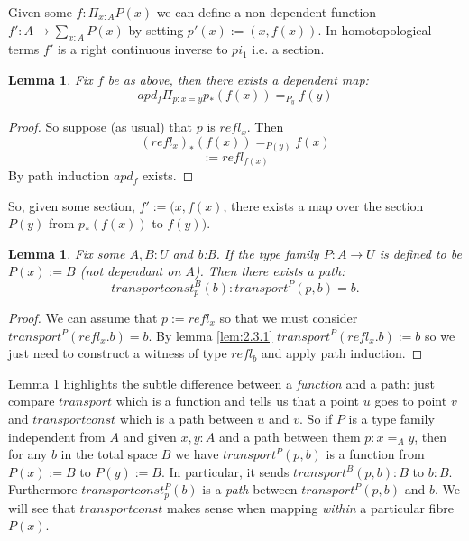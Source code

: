 \documentclass[12pt]{article} %
\newtheorem{lem}[thm]{Lemma}
\theoremstyle{definition}
\begin{document}
Given some $f : \Pi_{x:A}P(x)$ we can define a non-dependent function $f':A \rightarrow \sum_{x:A}P(x)$ by setting $p'(x) :=(x,f(x))$.  In homotopological terms $f'$ is a right continuous inverse to $pi_{1}$ i.e. a section.

\begin{lem}\label{lem:2.3.4}
 Fix $f$ be as above, then there exists a dependent map:
 \[apd_{f} \Pi_{p:x=y}p_{*}(f(x)) = _{P_{y}} f(y)\]
 \end{lem}

 \begin{proof}
  So suppose (as usual) that $p$ is $refl_{x}$.  Then
  \[(refl_{x})_{*}(f(x)) = _{P(y)} f(x)\]
  \[:=refl_{f(x)}\]
  By path induction $apd_{f}$ exists.
 \end{proof}
So, given some section, $f':=(x,f(x)$,  there exists a map over the section $P(y)$ from $p_{*}(f(x))$ to $f(y))$.  


\begin{lem}\label{lem:2.3.5}
Fix some $A,B : U$ and b:B. If the type family $P:A \rightarrow U$ is defined to be $P(x):=B$  (not dependant on $A$).  Then there exists a path:
\[transportconst^{B}_{p}(b): transport^{P}(p,b) = b .\]
\end{lem}
 
\begin{proof}
We can assume that $p := refl_{x}$ so that we must consider $transport^{P}(refl_{x}.b) = b$.  By lemma \ref{lem:2.3.1}  $transport^{P}(refl_{x}.b):=b$ so we just need to construct a witness of type $refl_{b}$ and apply path induction.  
\end{proof}


Lemma \ref{lem:2.3.5} highlights the subtle difference between a \emph{function} and  a path: just compare $transport$ which is a function and tells us that a point $u$ goes to point $v$  and $transportconst$ which is a path between $u$ and $v$.  
So if $P$ is a type family independent from $A$ and given $x,y:A$ and a path between them $p:x=_{A}y$, then for any $b$ in the total space $B$ we have $transport^{P}(p,b)$ is a function from $P(x):=B$ to $P(y):=B$.  In particular, it sends $transport^{B}(p,b):B$ to $b:B$.  Furthermore $transportconst^{P}_{p}(b)$ is a \emph{path} between  $transport^{P}(p,b)$ and  $b$.  We will see that $transportconst$ makes sense when mapping \emph{within} a particular fibre $P(x)$.   
\end{document}

